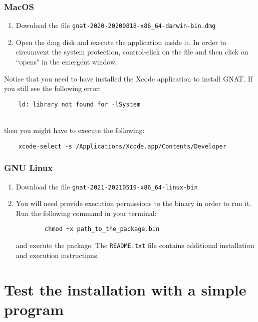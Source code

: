 \subsubsection*{MacOS}
\begin{enumerate}
	\item Download the file \texttt{gnat-2020-20200818-x86\_64-darwin-bin.dmg}
	\item Open the dmg disk and execute the application inside it.
	In order to circumvent the system protection,
	control-click on the file and then click on ``opens" in the emergent window.
\end{enumerate}

Notice that you need to have installed the Xcode application to install GNAT.
If you still see the following error:

\begin{BVerbatim}
	ld: library not found for -lSystem
\end{BVerbatim}
\\

then you might have to execute the following:

\begin{BVerbatim}
	xcode-select -s /Applications/Xcode.app/Contents/Developer
\end{BVerbatim}

\subsubsection*{GNU Linux}
\begin{enumerate}
	\item Download the file \texttt{gnat-2021-20210519-x86\_64-linux-bin}
	\item You will need provide execution permissions to the binary in order to run it.
	Run the following command in your terminal:
	
	\begin{BVerbatim}
		chmod +x path_to_the_package.bin
	\end{BVerbatim}
	
	and execute the package. The \texttt{README.txt} file
	contains additional installation and execution instructions.
\end{enumerate}

\section{Test the installation with a simple program}

